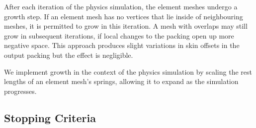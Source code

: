 After each iteration of the physics simulation, the element meshes undergo
a growth step.  If an element mesh has no vertices that lie inside of
neighbouring meshes, it is permitted to grow in this iteration.  A mesh with
overlaps may still grow in subsequent iterations, if local changes to the 
packing open up more negative space.
This approach produces slight variations in skin offsets in the output packing
but the effect is negligible.

We implement growth in the context of the physics simulation by scaling
the rest lengths of an element mesh's springs, allowing it to expand as the simulation
progresses.  




\subsection{Stopping Criteria}
\label{repulsionpak_stopping_criteria}



